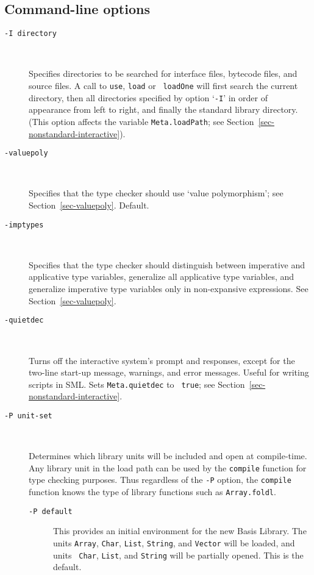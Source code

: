 \documentclass[fleqn]{article}
\begin{document}
\subsection{Command-line options}
\label{sec-mosml-options}

\begin{description}
\item[{\tt -I {\rm directory}}]\mbox{ }

  Specifies directories to be searched for interface files, bytecode
  files, and source files.  A call to {\tt use}, {\tt load} or {\tt
    loadOne} will first search the current directory, then all
  directories specified by option `{\tt -I}' in order of appearance
  from left to right, and finally the standard library directory.
  (This option affects the variable {\tt Meta.loadPath}; see
  Section~\ref{sec-nonstandard-interactive}).

\item[{\tt -valuepoly}]\mbox{ }

  Specifies that the type checker should use `value polymorphism'; see
  Section~\ref{sec-valuepoly}.  Default.

\item[{\tt -imptypes}]\mbox{ }

  Specifies that the type checker should distinguish between
  imperative and applicative type variables, generalize all
  applicative type variables, and generalize imperative type variables
  only in non-expansive expressions.  See Section~\ref{sec-valuepoly}.

\item[{\tt -quietdec}]\mbox{ }

  Turns off the interactive system's prompt and responses, except for
  the two-line start-up message, warnings, and error messages.  Useful
  for writing scripts in SML\@.  Sets {\tt Meta.quietdec} to {\tt
    true}; see Section~\ref{sec-nonstandard-interactive}.

\item[{\tt -P {\rm unit-set}}]\mbox{ }

  Determines which library units will be included and open at
  compile-time.  Any library unit in the load path can be used by the
  {\tt compile} function for type checking purposes.  Thus regardless
  of the {\tt -P} option, the {\tt compile} function knows the type of
  library functions such as {\tt Array.foldl}.

  \begin{description}
  \item[{\tt -P default}] This provides an initial environment for the
    new Basis Library.  The units {\tt Array}, {\tt Char}, {\tt List},
    {\tt String}, and {\tt Vector} will be loaded, and units {\tt
      Char}, {\tt List}, and {\tt String} will be partially opened.
    This is the default.


\end{description}
\end{description}
\end{document}
